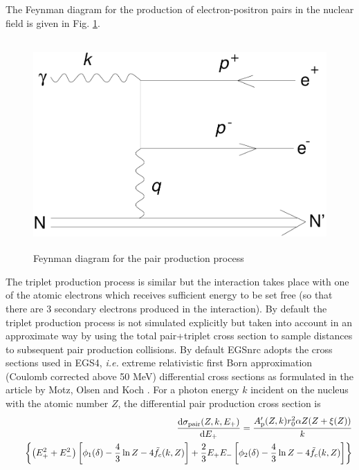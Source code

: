 The Feynman diagram for the production of electron-positron pairs 
in the nuclear field is given in Fig. \ref{pair_fig}. 
\begin{figure}[h]
\includegraphics[height=8cm,width=12cm]{figures/pair}
\caption{\label{pair_fig} Feynman diagram for the pair 
production process}
\end{figure}
The triplet production process is similar but the interaction 
takes place with one of the atomic electrons which receives 
sufficient energy to be set free (so that there are 3 secondary electrons 
produced in the interaction). By default 
the triplet production process is 
not simulated explicitly but taken into account in an approximate 
way by using the total pair+triplet cross section to 
sample distances to subsequent pair production collisions.
By default EGSnrc adopts the cross sections used in EGS4, {\em i.e.} 
extreme relativistic first Born approximation 
(Coulomb corrected above 50 MeV) 
differential cross sections  as formulated in the article by 
Motz, Olsen and Koch \cite{Mo69}. For a photon energy 
$k$ incident on the nucleus with the atomic number $Z$, the 
differential pair production cross section is
\begin{eqnarray}
\label{pair-e}
& & {{\rm d}\sigma_{\rm pair}(Z,k,E_+) \over {\rm d}E_+}  = 
{A_{\rm p}'(Z,k) r_0^2 \alpha Z (Z + \xi(Z) ) \over k} 
\\ & & \quad 
\left\{ \left( E_+^2 + E_-^2 \right) \left[ \phi_1(\delta) - 
{4 \over 3} \ln Z  - 4 \tilde{f}_c(k,Z) \right] + 
{2 \over 3} E_+ E_- \left[ \phi_2(\delta) - 
{4 \over 3} \ln Z  - 4 \tilde{f}_c(k,Z) \right] \right\} 
\nonumber
\end{eqnarray}
